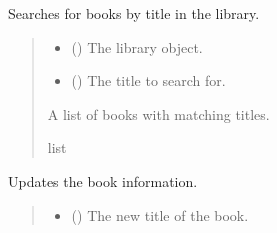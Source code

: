 \documentclass[letterpaper,10pt,english,openany,oneside]{sphinxmanual}
\begin{document}
\begin{fulllineitems}
\begin{fulllineitems}
\end{fulllineitems}


\begin{fulllineitems}
\label{\detokenize{book:book.Book.search_by_title}}
\pysigstartsignatures
{}
\pysigstopsignatures
\sphinxAtStartPar
Searches for books by title in the library.
\begin{quote}\begin{description}
\begin{itemize}
\item {} 
\sphinxAtStartPar
{} ({\hyperref[\detokenize{library:library.Library}]{}}) \textendash{} The library object.

\item {} 
\sphinxAtStartPar
{} () \textendash{} The title to search for.

\end{itemize}

\sphinxAtStartPar
A list of books with matching titles.

\sphinxAtStartPar
list

\end{description}\end{quote}

\end{fulllineitems}


\begin{fulllineitems}
\label{\detokenize{book:book.Book.update}}
\pysigstartsignatures
{}
\pysigstopsignatures
\sphinxAtStartPar
Updates the book information.
\begin{quote}\begin{description}
\begin{itemize}
\item {} 
\sphinxAtStartPar
{} (\sphinxstyleliteralemphasis{\sphinxupquote{, }}) \textendash{} The new title of the book.


\end{itemize}
\end{description}
\end{quote}
\end{fulllineitems}
\end{fulllineitems}
\end{document}
